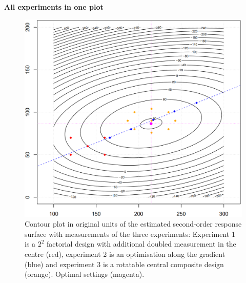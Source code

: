 \textbf{All experiments in one plot}\\
\begin{figure}[H]
  \centering
  \includegraphics[width=.8\linewidth]{Pics/15.2.3.png}
  \caption{Contour plot in original units of the estimated second-order response surface with measurements of the three experiments: Experiment 1 is a $2^2$ factorial design with additional doubled measurement in the centre (red), experiment 2 is an optimisation along the gradient (blue) and experiment 3 is a rotatable central composite design (orange). Optimal settings (magenta).}
\end{figure}
